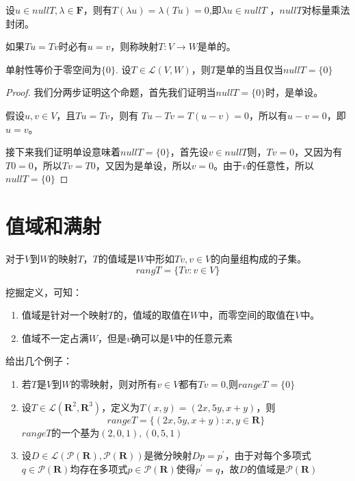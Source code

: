 \documentclass[10pt,a4paper,UTF8]{article}
\begin{document}
设\(u\in nullT, \lambda \in \mathbf{F}\)，则有\(T(\lambda u) = \lambda (Tu) = 0\),即\(\lambda u \in nullT\) ，\(nullT\)对标量乘法封闭。

\begin{definition}
如果\(Tu = Tv\)时必有\(u = v\)，则称映射\(T:V \rightarrow W\)是单的。
\end{definition}

\begin{theorem}
单射性等价于零空间为\(\{0\}\). 设\(T\in \mathcal{L}(V,W)\)，则\(T\)是单的当且仅当\(nullT = \{0\}\)
\end{theorem}
\begin{proof}
我们分两步证明这个命题，首先我们证明当\(nullT = \{0\}\)时，是单设。

假设\(u,v\in V\)，且\(Tu = Tv\)，则有 \(Tu - Tv = T(u-v) = 0\)，所以有\(u-v = 0\)，即\(u=v\)。

接下来我们证明单设意味着\(nullT = \{0\}\)，首先设\(v\in nullT\)则，\(Tv = 0\)，又因为有\(T0=0\)，所以\(Tv=T0\)，又因为是单设，所以\(v=0\)。由于\(v\)的任意性，所以\(nullT = \{0\}\)
\end{proof}
\section{值域和满射}
\label{sec:org2876bcf}


\begin{definition}
对于\(V\)到\(W\)的映射\(T\)，\(T\)的值域是\(W\)中形如\(Tv,v\in V\)的向量组构成的子集。\[rangT = \{Tv:v\in V\}\]
\end{definition}
挖掘定义，可知：
\begin{enumerate}
\item 值域是针对一个映射\(T\)的，值域的取值在\(W\)中，而零空间的取值在\(V\)中。
\item 值域不一定占满\(W\)，但是\(v\)确可以是\(V\)中的任意元素
\end{enumerate}

给出几个例子：
\begin{instance}
\begin{enumerate}
\item 若\(T\)是\(V\)到\(W\)的零映射，则对所有\(v\in V\)都有\(Tv=0\),则\(rangeT = \{0\}\)
\item 设\(T\in \mathcal{L}( \mathbf{R}^{2}, \mathbf{R}^{3})\)，定义为\(T(x,y) = (2x,5y,x+y)\)，则\[rangeT = \{(2x,5y,x+y):x,y\in \mathbf{R}\}\] \(rangeT\)的一个基为\((2,0,1),(0,5,1)\)
\item 设\(D\in \mathcal{L}( \mathcal{P}( \mathbf{R}), \mathcal{P}( \mathbf{R}))\)是微分映射\(Dp = p^{'}\)，由于对每个多项式\(q \in \mathcal{P}( \mathbf{R})\)均存在多项式\(p\in \mathcal{P}( \mathbf{R})\)使得\(p^{'} = q\)，故\(D\)的值域是\(\mathcal{P}( \mathbf{R})\)
\end{enumerate}
\end{instance}
\end{document}
